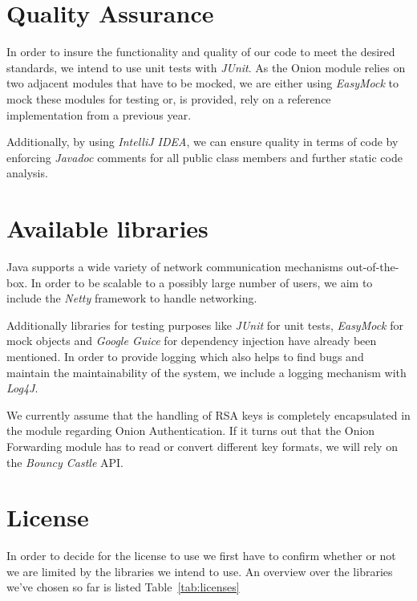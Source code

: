 \documentclass[paper=letter, fontsize=12pt]{article}
\begin{document}
\section{Quality Assurance}
In order to insure the functionality and quality of our code to meet the desired standards, we intend to use unit tests with \emph{JUnit}. As the Onion module relies on two adjacent modules that have to be mocked, we are either using \emph{EasyMock} to mock these modules for testing or, is provided, rely on a reference implementation from a previous year.

Additionally, by using \emph{IntelliJ IDEA}, we can ensure quality in terms of code by enforcing \emph{Javadoc} comments for all public class members and further static code analysis.

\section{Available libraries}
Java supports a wide variety of network communication mechanisms out-of-the-box. In order to be scalable to a possibly large number of users, we aim to include the \emph{Netty} framework to handle networking. 

Additionally libraries for testing purposes like \emph{JUnit} for unit tests, \emph{EasyMock} for mock objects and \emph{Google Guice} for dependency injection have already been mentioned. In order to provide logging which also helps to find bugs and maintain the maintainability of the system, we include a logging mechanism with \emph{Log4J}.

We currently assume that the handling of RSA keys is completely encapsulated in the module regarding Onion Authentication. If it turns out that the Onion Forwarding module has to read or convert different key formats, we will rely on the \emph{Bouncy Castle} API.

\section{License}
In order to decide for the license to use we first have to confirm whether or not we are limited by the libraries we intend to use. An overview over the libraries we've chosen so far is listed Table~\ref{tab:licenses}
\end{document}
